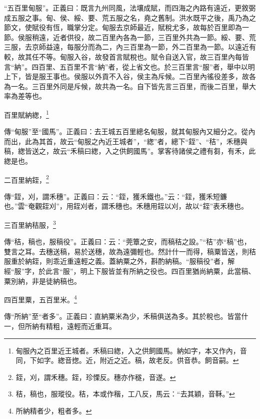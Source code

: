 {\noindent\shu{}\fzkt “五百里甸服”。正義曰：既言九州同風，法壤成賦，而四海之內路有遠近，更敘弼成五服之事。甸、侯、綏、要、荒五服之名，堯之舊制。洪水既平之後，禹乃為之節文，使賦役有恆，職掌分定。甸服去京師最近，賦稅尤多，故每於百里即為一節。侯服稍遠，近者供役，故二百里內各為一節，三百里外共為一節。綏、要、荒三服，去京師益遠，每服分而為二，內三百里為一節，外二百里為一節。以遠近有較，故其任不等。甸服入谷，故發首言賦稅也。賦令自送入官，故三百里內每皆言“納”。四百里、五百里不言“納”者，從上省文也。於三百里言“服”者，舉中以明上下，皆是服王事也。侯服以外貢不入谷，侯主為斥候。二百里內徭役差多，故各為一名。三百里外同是斥候，故共為一名。自下皆先言三百里，而後二百里，舉大率為差等也。 \par}

百里賦納緫，\footnote{甸服內之百里近王城者。禾稿曰緫，入之供飼國馬。納如字，本又作內，音同，下如字。緫音揔。近，附近之近。稿，故老反。供音恭。飼音嗣。}

{\noindent\zhuan{}\fzbyks 傳“甸服”至“國馬”。正義曰：去王城五百里總名甸服，就其甸服內又細分之。從內而出，此為其首，故云“甸服之內近王城者”，“緫”者，總下“銍”、“秸”，禾穗與稿，緫皆送之，故云“禾稿曰緫，入之供飼國馬”。掌客待諸侯之禮有芻，有禾，此緫是也。 \par}

二百里納銍，\footnote{銍，刈，謂禾穗。銍，珍慄反。穗亦作穟，音遂。}

{\noindent\zhuan{}\fzbyks 傳“銍，刈，謂禾穗”。正義曰：云：“銍，獲禾鐵也。”云：“銍，獲禾短鐮也。”雲“奄觀銍刈”，用銍刈者，謂禾穗也。禾穗用銍以刈，故以“銍”表禾穗也。 \par}

三百里納秸服，\footnote{秸，稿也，服瑽役。秸，本或作稭，工八反，馬云：“去其穎，音鞂。”}

{\noindent\zhuan{}\fzbyks 傳“秸，稿也，服稿役”。正義曰：云：“莞簟之安，而稿秸之設。”“秸”亦“稿”也，雙言之耳。去穗送稿，易於送穗，故為遠彌輕也。然計什一而得，稿粟皆送，則秸服重於納銍，則乖近重遠輕之義。蓋納粟之外，斟酌納稿。“服稿役”者，解經“服”字，於此言“服”，明上下服皆並有所納之役也。四百里猶尚納粟，此當稿、粟別納，非是徒納稿也。 \par}

四百里粟，五百里米。\footnote{所納精者少，粗者多。}

{\noindent\zhuan{}\fzbyks 傳“所納”至“者多”。正義曰：直納粟米為少，禾稿俱送為多。其於稅也。皆當什一，但所納有精粗，遠輕而近重耳。 \par}

